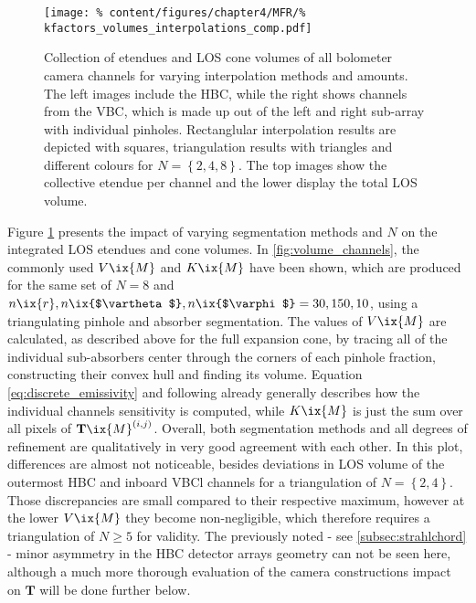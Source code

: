 %
            \begin{figure}[t]%
                \centering%
                \texttt{[image: \%
                    content/figures/chapter4/MFR/\%
                    kfactors\_volumes\_interpolations\_comp.pdf]}%
                \caption{Collection of etendues and LOS cone volumes of all bolometer camera channels for varying interpolation methods and amounts. The left images include the HBC, while the right shows channels from the VBC, which is made up out of the left and right sub-array with individual pinholes. Rectanglular interpolation results are depicted with squares, triangulation results with triangles and different colours for $N=\left\{2,4,8\right\}$. The top images show the collective etendue per channel and the lower display the total LOS volume.}\label{fig:kfactors_comparison_splitting}%
            \end{figure}%
%
            Figure \ref{fig:kfactors_comparison_splitting} presents the impact of varying segmentation methods and $N$ on the integrated LOS etendues and cone volumes. In \cref{fig:volume_channels}, the commonly used $V\ix{M}$ and $K\ix{M}$ have been shown, which are produced for the same set of $N=8$ and $n\ix{r},n\ix{$\vartheta$},n\ix{$\varphi$}=30,150,10$, using a triangulating pinhole and absorber segmentation. The values of $V\ix{M}$ are calculated, as described above for the full expansion cone, by tracing all of the individual sub-absorbers center through the corners of each pinhole fraction, constructing their convex hull and finding its volume. Equation \ref{eq:discrete_emissivity} and following already generally describes how the individual channels sensitivity is computed, while $K\ix{M}$ is just the sum over all pixels of $\mathbf{T}\ix{M}^{\left(i,j\right)}$. Overall, both segmentation methods and all degrees of refinement are qualitatively in very good agreement with each other. In this plot, differences are almost not noticeable, besides deviations in LOS volume of the outermost HBC and inboard VBCl channels for a triangulation of $N=\left\{2,4\right\}$. Those discrepancies are small compared to their respective maximum, however at the lower $V\ix{M}$ they become non-negligible, which therefore requires a triangulation of $N\ge5$ for validity. The previously noted - see \cref{subsec:strahlchord} - minor asymmetry in the HBC detector arrays geometry can not be seen here, although a much more thorough evaluation of the camera constructions impact on $\mathbf{T}$ will be done further below.\\%
